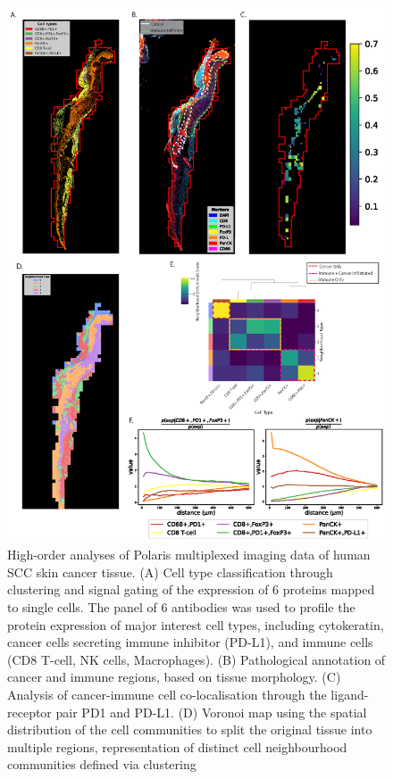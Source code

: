\begin{figure}
    \centering
    \includegraphics[width=0.8\columnwidth]{Chapter3/Figures/Minh_figure3-01.png}
    \caption[Analyses of Polaris multiplexed imaging of human SCC skin cancer tissue. ]{High-order analyses of Polaris multiplexed imaging data of human SCC skin cancer tissue. (A) Cell type classification through clustering and signal gating of the expression of 6 proteins mapped to single cells. The panel of 6 antibodies was used to profile the protein expression of major interest cell types, including cytokeratin, cancer cells secreting immune inhibitor (PD-L1), and immune cells (CD8 T-cell, NK cells, Macrophages). (B) Pathological annotation of cancer and immune regions, based on tissue morphology. (C) Analysis of cancer-immune cell co-localisation through the ligand-receptor pair PD1 and PD-L1. (D) Voronoi map using the spatial distribution of the cell communities to split the original tissue into multiple regions, representation of distinct cell neighbourhood communities defined via clustering}
    \label{fig:skin_cancer_polaris}
    
\end{figure}
